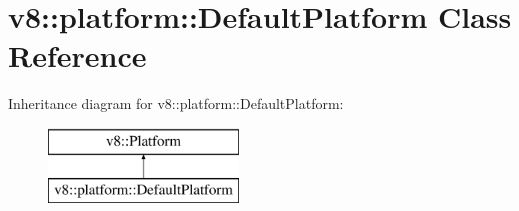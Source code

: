 \hypertarget{classv8_1_1platform_1_1_default_platform}{}\section{v8\+:\+:platform\+:\+:Default\+Platform Class Reference}
\label{classv8_1_1platform_1_1_default_platform}
Inheritance diagram for v8\+:\+:platform\+:\+:Default\+Platform\+:\begin{figure}[H]
\begin{center}
\leavevmode
\includegraphics[height=2.000000cm]{classv8_1_1platform_1_1_default_platform}
\end{center}
\end{figure}
